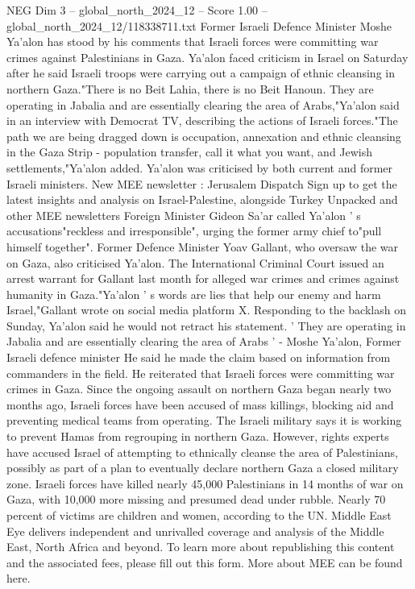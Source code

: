 \begin{textsample}{NEG Dim 3 – global\_north\_2024\_12 – Score 1.00 – global\_north\_2024\_12/118338711.txt}  \label{ex:f3_neg_249}
Former Israeli Defence Minister Moshe Ya'alon has stood by his comments that Israeli forces were committing war crimes against Palestinians in Gaza.
Ya'alon faced criticism in Israel on Saturday after he said Israeli troops were carrying out a campaign of ethnic cleansing in northern Gaza."There is no Beit Lahia, there is no Beit Hanoun.
They are operating in Jabalia and are essentially clearing the area of Arabs,"Ya'alon said in an interview with Democrat TV, describing the actions of Israeli forces."The path we are being dragged down is occupation, annexation and ethnic cleansing in the Gaza Strip - population transfer, call it what you want, and Jewish settlements,"Ya'alon added.
Ya'alon was criticised by both current and former Israeli ministers.
New MEE newsletter : Jerusalem Dispatch Sign up to get the latest insights and analysis on Israel-Palestine, alongside Turkey Unpacked and other MEE newsletters Foreign Minister Gideon Sa'ar called Ya'alon ' s accusations"reckless and irresponsible", urging the former army chief to"pull himself together".
Former Defence Minister Yoav Gallant, who oversaw the war on Gaza, also criticised Ya'alon.
The International Criminal Court issued an arrest warrant for Gallant last month for alleged war crimes and crimes against humanity in Gaza."Ya'alon ' s words are lies that help our enemy and harm Israel,"Gallant wrote on social media platform X.
Responding to the backlash on Sunday, Ya'alon said he would not retract his statement. ' They are operating in Jabalia and are essentially clearing the area of Arabs ' - Moshe Ya'alon, Former Israeli defence minister He said he made the claim based on information from commanders in the field.
He reiterated that Israeli forces were committing war crimes in Gaza.
Since the ongoing assault on northern Gaza began nearly two months ago, Israeli forces have been accused of mass killings, blocking aid and preventing medical teams from operating.
The Israeli military says it is working to prevent Hamas from regrouping in northern Gaza.
However, rights experts have accused Israel of attempting to ethnically cleanse the area of Palestinians, possibly as part of a plan to eventually declare northern Gaza a closed military zone.
Israeli forces have killed nearly 45,000 Palestinians in 14 months of war on Gaza, with 10,000 more missing and presumed dead under rubble.
Nearly 70 percent of victims are children and women, according to the UN.
Middle East Eye delivers independent and unrivalled coverage and analysis of the Middle East, North Africa and beyond.
To learn more about republishing this content and the associated fees, please fill out this form.
More about MEE can be found here.

\end{textsample}
